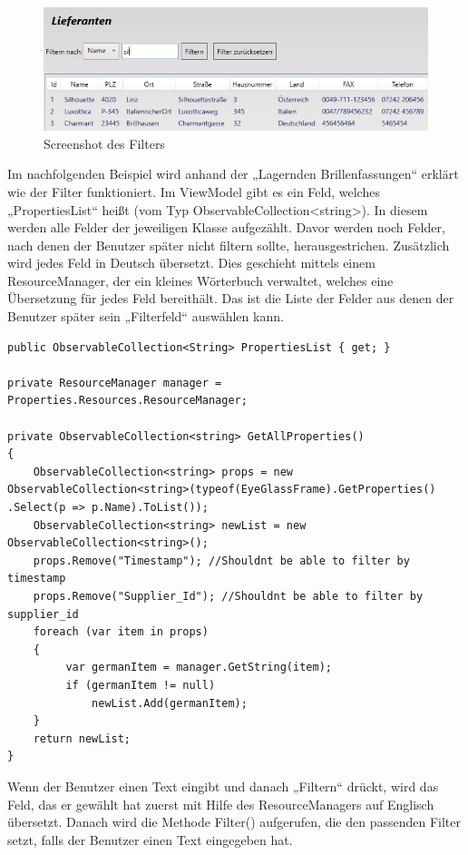 \begin{figure}[H]
\begin{center}
	\includegraphics[scale=0.75]{images/filter.png}
\end{center}
	\caption{Screenshot des Filters}
	\label{fig:sample}
\end{figure}
Im nachfolgenden Beispiel wird anhand der „Lagernden Brillenfassungen“ erklärt wie der Filter funktioniert. 
Im ViewModel gibt es ein Feld, welches „PropertiesList“ heißt (vom Typ ObservableCollection\textless string\textgreater). In diesem werden alle Felder der jeweiligen Klasse aufgezählt. Davor werden noch Felder, nach denen der Benutzer später nicht filtern sollte, herausgestrichen. Zusätzlich wird jedes Feld in Deutsch übersetzt. Dies geschieht mittels einem ResourceManager, der ein kleines Wörterbuch verwaltet, welches eine Übersetzung für jedes Feld bereithält. Das ist die Liste der Felder aus denen der Benutzer später sein „Filterfeld“ auswählen kann. 
\begin{lstlisting}
public ObservableCollection<String> PropertiesList { get; }

private ResourceManager manager = Properties.Resources.ResourceManager;

private ObservableCollection<string> GetAllProperties()
{
	ObservableCollection<string> props = new 							ObservableCollection<string>(typeof(EyeGlassFrame).GetProperties()
.Select(p => p.Name).ToList());
	ObservableCollection<string> newList = new ObservableCollection<string>();
	props.Remove("Timestamp"); //Shouldnt be able to filter by timestamp
    props.Remove("Supplier_Id"); //Shouldnt be able to filter by supplier_id
    foreach (var item in props)
    {
         var germanItem = manager.GetString(item);
         if (germanItem != null)
             newList.Add(germanItem);
    }
    return newList;
}
\end{lstlisting}
Wenn der Benutzer einen Text eingibt und danach „Filtern“ drückt, wird das Feld, das er gewählt hat zuerst mit Hilfe des ResourceManagers auf Englisch übersetzt.  Danach wird die Methode Filter() aufgerufen, die den passenden Filter setzt, falls der Benutzer einen Text eingegeben hat.
